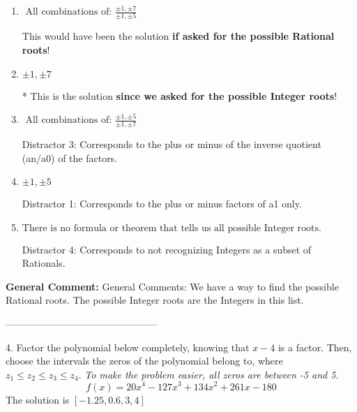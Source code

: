 \documentclass{extbook}[14pt]
\begin{document}
\begin{enumerate}[label=\Alph*.] 
\item $ \text{ All combinations of: }\frac{\pm 1,\pm 7}{\pm 1,\pm 5} $ 

 This would have been the solution \textbf{if asked for the possible Rational roots}! 
\item $ \pm 1,\pm 7 $ 

 * This is the solution \textbf{since we asked for the possible Integer roots}! 
\item $ \text{ All combinations of: }\frac{\pm 1,\pm 5}{\pm 1,\pm 7} $ 

  Distractor 3: Corresponds to the plus or minus of the inverse quotient (an/a0) of the factors.  
\item $ \pm 1,\pm 5 $ 

  Distractor 1: Corresponds to the plus or minus factors of a1 only. 
\item $ \text{There is no formula or theorem that tells us all possible Integer roots.} $ 

  Distractor 4: Corresponds to not recognizing Integers as a subset of Rationals. 
\end{enumerate} 
 
\textbf{General Comment:} General Comments: We have a way to find the possible Rational roots. The possible Integer roots are the Integers in this list. 

-----------------------------------------------

4. Factor the polynomial below completely, knowing that $x-4$ is a factor. Then, choose the intervals the zeros of the polynomial belong to, where $z_1 \leq z_2 \leq z_3 \leq z_4$. \textit{To make the problem easier, all zeros are between -5 and 5.}
\[ f(x) = 20x^{4} -127 x^{3} +134 x^{2} +261 x -180 \] 
The solution is $ [-1.25, 0.6, 3, 4] $ 
\end{document}
